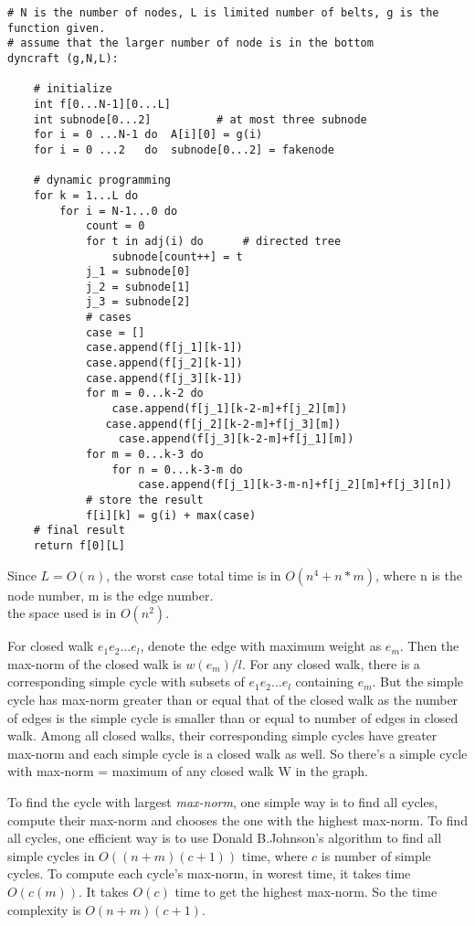 \documentclass[12pt,a4paper]{article}
\newcommand{\question}[1]{\bigskip\noindent{\textbf{Q{#1} solution}}}
\begin{document}
\begin{lstlisting}
# N is the number of nodes, L is limited number of belts, g is the function given.
# assume that the larger number of node is in the bottom
dyncraft (g,N,L):  

	# initialize
	int f[0...N-1][0...L]
	int subnode[0...2]  		# at most three subnode
	for i = 0 ...N-1 do  A[i][0] = g(i)
	for i = 0 ...2 	 do  subnode[0...2] = fakenode
	
	# dynamic programming
	for k = 1...L do
	    for i = N-1...0 do
	        count = 0
	        for t in adj(i) do  	# directed tree
	            subnode[count++] = t
	        j_1 = subnode[0]
	        j_2 = subnode[1]
	        j_3 = subnode[2]
	        # cases
	        case = []
	        case.append(f[j_1][k-1])
	        case.append(f[j_2][k-1])
	        case.append(f[j_3][k-1])
	        for m = 0...k-2 do
	            case.append(f[j_1][k-2-m]+f[j_2][m]) 
		   	   case.append(f[j_2][k-2-m]+f[j_3][m])
		         case.append(f[j_3][k-2-m]+f[j_1][m])
	        for m = 0...k-3 do
	            for n = 0...k-3-m do
		            case.append(f[j_1][k-3-m-n]+f[j_2][m]+f[j_3][n])
	        # store the result
	        f[i][k] = g(i) + max(case)
	# final result
	return f[0][L]

\end{lstlisting}
Since $L = O(n)$, the worst case total time is in $O(n^4 + n*m)$, where n is the node number, m is the edge number.\\
the space used is in $O(n^2)$.\\


\question{27.A}

For closed walk $e_1e_2\dots e_l$, denote the edge with maximum weight as $e_m$. Then the max-norm of the closed walk is $w(e_m)/l$. For any closed walk, there is a corresponding simple cycle with subsets of $e_1e_2\dots e_l$ containing $e_m$. But the simple cycle has max-norm greater than or equal that of the closed walk as the number of edges is the simple cycle is smaller than or equal to number of edges in closed walk. Among all closed walks, their corresponding simple cycles have greater max-norm and each simple cycle is a closed walk as well. So there's a simple cycle with max-norm = maximum of any closed walk W in the graph.

\question{27.B}

To find the cycle with largest {\em max-norm}, one simple way is to find all cycles, compute their max-norm and chooses the one with the highest max-norm. To find all cycles, one efficient way is to use Donald B.Johnson's algorithm to find all simple cycles in $O((n + m)(c + 1))$ time, where $c$ is number of simple cycles\cite{doi:10.1137/0204007}. To compute each cycle's max-norm, in worest time, it takes time $O(c(m))$. It takes $O(c)$ time to get the highest max-norm. So the time complexity is $O(n + m)(c + 1)$.



\end{document}
